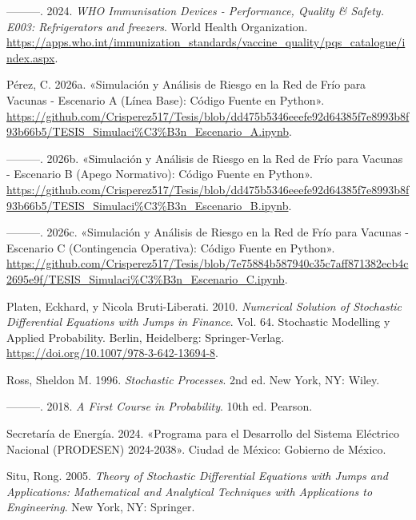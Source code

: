 \documentclass[
  spanish,
  us-letterpaper,
]{scrreprt}
\newlength{\cslhangindent}
\newenvironment{CSLReferences}[2] %
 {\begin{list}{}{%
  \setlength{\itemindent}{0pt}
  \setlength{\leftmargin}{0pt}
  \setlength{\parsep}{0pt}
  \ifodd #1
   \setlength{\leftmargin}{\cslhangindent}
   \setlength{\itemindent}{-1\cslhangindent}
  \fi
  \setlength{\itemsep}{#2\baselineskip}}}
 {\end{list}}
\numberwithin{equation}{section}
\theoremstyle{plain}
\theoremstyle{plain}
\theoremstyle{plain}
\theoremstyle{definition}
\theoremstyle{remark}
\begin{document}
\begin{CSLReferences}{1}{0}
---------. 2024. \emph{WHO Immunisation Devices - Performance, Quality
\& Safety. E003: Refrigerators and freezers}. World Health Organization.
\url{https://apps.who.int/immunization_standards/vaccine_quality/pqs_catalogue/index.aspx}.

Pérez, C. 2026a. {«Simulación y Análisis de Riesgo en la Red de Frío
para Vacunas - Escenario A (Línea Base): Código Fuente en Python»}.
\url{https://github.com/Crisperez517/Tesis/blob/dd475b5346eeefe92d64385f7e8993b8f93b66b5/TESIS_Simulaci\%C3\%B3n_Escenario_A.ipynb}.

---------. 2026b. {«Simulación y Análisis de Riesgo en la Red de Frío
para Vacunas - Escenario B (Apego Normativo): Código Fuente en Python»}.
\url{https://github.com/Crisperez517/Tesis/blob/dd475b5346eeefe92d64385f7e8993b8f93b66b5/TESIS_Simulaci\%C3\%B3n_Escenario_B.ipynb}.

---------. 2026c. {«Simulación y Análisis de Riesgo en la Red de Frío
para Vacunas - Escenario C (Contingencia Operativa): Código Fuente en
Python»}.
\url{https://github.com/Crisperez517/Tesis/blob/7e75884b587940c35c7aff871382ecb4c2695e9f/TESIS_Simulaci\%C3\%B3n_Escenario_C.ipynb}.

Platen, Eckhard, y Nicola Bruti-Liberati. 2010. \emph{Numerical Solution
of Stochastic Differential Equations with Jumps in Finance}. Vol. 64.
Stochastic Modelling y Applied Probability. Berlin, Heidelberg:
Springer-Verlag. \url{https://doi.org/10.1007/978-3-642-13694-8}.

Ross, Sheldon M. 1996. \emph{Stochastic Processes}. 2nd ed. New York,
NY: Wiley.

---------. 2018. \emph{A First Course in Probability}. 10th ed. Pearson.

Secretaría de Energía. 2024. {«Programa para el Desarrollo del Sistema
Eléctrico Nacional (PRODESEN) 2024-2038»}. Ciudad de México: Gobierno de
México.

Situ, Rong. 2005. \emph{Theory of Stochastic Differential Equations with
Jumps and Applications: Mathematical and Analytical Techniques with
Applications to Engineering}. New York, NY: Springer.


\end{CSLReferences}
\end{document}
